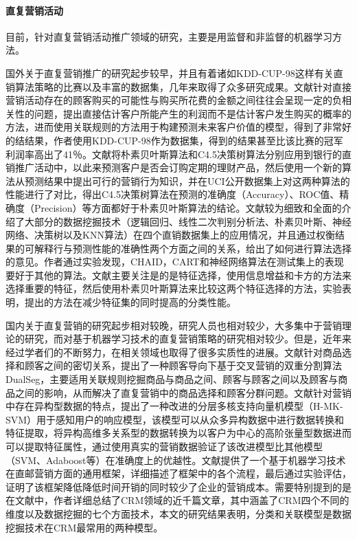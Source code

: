 \paragraph{直复营销活动}
目前，针对直复营销活动推广领域的研究，主要是用监督和非监督的机器学习方法。

国外关于直复营销推广的研究起步较早，并且有着诸如KDD-CUP-98这样有关直销算法策略的比赛以及丰富的数据集，几年来取得了众多研究成果。文献\citep{wong2005mining}针对直接营销活动存在的顾客购买的可能性与购买所花费的金额之间往往会呈现一定的负相关性的问题，提出直接估计客户所能产生的利润而不是估计客户发生购买的概率的方法，进而使用关联规则的方法用于构建预测未来客户价值的模型，得到了非常好的结结果，作者使用KDD-CUP-98作为数据集，得到的结果甚至比该比赛的冠军利润率高出了41％。文献\citep{karim2013decision}将朴素贝叶斯算法和C4.5决策树算法分别应用到银行的直销推广活动中，以此来预测客户是否会订购定期的理财产品，然后使用一个新的算法\citep{alam2012actionable}从预测结果中提出可行的营销行为知识，并在UCI公开数据集上对这两种算法的性能进行了对比，得出C4.5决策树算法在预测的准确度（Accuracy）、ROC值、精确度（Precision）等方面都好于朴素贝叶斯算法的结论。文献\citep{coussement2015improving}较为细致和全面的介绍了大部分的数据挖掘技术（逻辑回归、线性二次判别分析法、朴素贝叶斯、神经网络、决策树以及KNN算法）在四个直销数据集上的应用情况，并且通过权衡结果的可解释行与预测性能的准确性两个方面之间的关系，给出了如何进行算法选择的意见。作者通过实验发现，CHAID，CART和神经网络算法在测试集上的表现要好于其他的算法。文献\citep{parlar2017using}主要关注是的是特征选择，使用信息增益和卡方的方法来选择重要的特征，然后使用朴素贝叶斯算法来比较这两个特征选择的方法，实验表明，提出的方法在减少特征集的同时提高的分类性能。

国内关于直复营销的研究起步相对较晚，研究人员也相对较少，大多集中于营销理论的研究，而对基于机器学习技术的直复营销策略的研究相对较少。但是，近年来经过学者们的不断努力，在相关领域也取得了很多实质性的进展。文献\citep{徐笑昂2007直复营销模式下的商品选择和顾客分群算法研究}针对商品选择和顾客之间的密切关系，提出了一种顾客导向下基于交叉营销的双重分割算法DualSeg，主要适用关联规则挖掘商品与商品之间、顾客与顾客之间以及顾客与商品之间的影响，从而解决了直复营销中的商品选择和顾客分群问题。文献\citep{chen2015behavior}针对营销中存在异构型数据的特点，提出了一种改进的分层多核支持向量机模型（H-MK-SVM）用于感知用户的响应模型，该模型可以从众多异构数据中进行数据转换和特征提取，将异构高维多关系型的数据转换为以客户为中心的高阶张量型数据进而可以提取特征属性，通过使用真实的营销数据验证了该改进模型比其他模型（SVM、Adaboost等）在准确度上的优越性。文献\citep{sing2013data}提供了一个基于机器学习技术在直邮营销方面的通用框架，详细描述了框架中的各个流程，最后通过实验评估，证明了该框架降低降低时间开销的同时较少了企业的营销成本。需要特别提到的是在文献\citep{ngai2009application}中，作者详细总结了CRM领域的近千篇文章，其中涵盖了CRM四个不同的维度以及数据挖掘的七个方面技术，本文的研究结果表明，分类和关联模型是数据挖掘技术在CRM最常用的两种模型。


